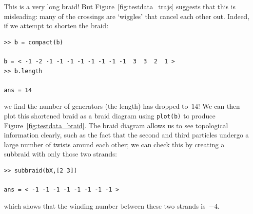 \documentclass[12pt]{article}
\begin{document}
This is a very long braid!  But Figure~\ref{fig:testdata_trajs}
suggests that this is misleading: many of the crossings are `wiggles'
that cancel each other out.  Indeed, if we attempt to shorten the
braid:
\begin{lstlisting}[frame=single,framerule=0pt]
>> b = compact(b)

b = < -1 -2 -1 -1 -1 -1 -1 -1 -1 -1  3  3  2  1 >
>> b.length

ans = 14
\end{lstlisting}
we find the number of generators (the length) has dropped to~$14$!  We
can then plot this shortened braid as a braid diagram using
\lstinline{plot(b)} to produce Figure~\ref{fig:testdata_braid}.  The
braid diagram allows us to see topological information clearly, such
as the fact that the second and third particles undergo a large number
of twists around each other; we can check this by creating a subbraid
with only those two strands:
\begin{lstlisting}[frame=single,framerule=0pt]
>> subbraid(bX,[2 3])

ans = < -1 -1 -1 -1 -1 -1 -1 -1 >
\end{lstlisting}
which shows that the winding number between these two strands is~$-4$.
\end{document}
